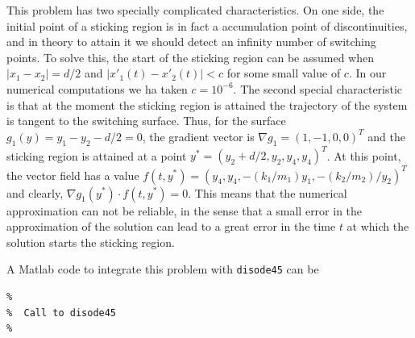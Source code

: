 \documentclass{article}
\begin{document}
\begin{description}
This problem has two specially complicated characteristics.  On one side, the initial point of a sticking region
is in fact a accumulation point of discontinuities, and in theory to attain it we should detect
an infinity number of switching points.  To solve this, the start of the sticking region can be
assumed when $|x_1 -x_2|=d/2$ and $|x'_1(t)-x'_2(t)| < c$ for some small value of $c$.  In our numerical
computations we ha taken $c=10^{-6}$.
The second special characteristic is that at the moment the sticking region is attained the trajectory of
the system is tangent to the switching surface.  Thus, for the surface $g_1(y)=y_1-y_2-d/2=0$,
the gradient vector is $\nabla g_1=(1,-1,0,0)^T$ and the sticking region is attained at a point
$y^*=(y_2 +d/2, y_2, y_4, y_4)^T$.  At this point, the vector field has a value
$f(t,y^*)= (y_4, y_4, -(k_1/m_1) y_1, -(k_2/m_2)/y_2)^T $ and clearly,
$\nabla g_1(y^*) \cdot f(t,y^*)=0$.
This means that the numerical approximation can not be reliable, in the sense that a small error
in the approximation of the solution can lead to a great error in the time $t$ at which the
solution starts the sticking region.

A Matlab code to integrate this problem with \texttt{disode45} can be

\bigskip

\begin{verbatim}
%
%  Call to disode45
%


\end{verbatim}
\end{description}
\end{document}
